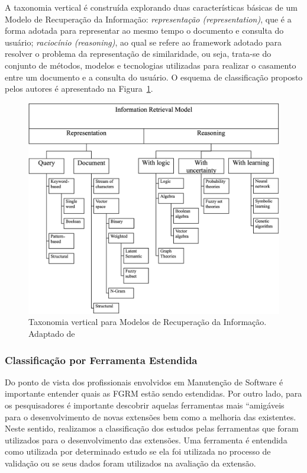 
A taxonomia vertical é construída explorando duas características básicas de um
Modelo de Recuperação da Informação: \textit{representação (representation)},
que é a forma adotada para representar ao mesmo tempo o documento e consulta do
usuário; \textit{raciocínio (reasoning)}, ao qual se refere ao framework adotado
para resolver o problema da representação de similaridade, ou seja, trata-se do
conjunto de métodos, modelos e tecnologias utilizadas para realizar o casamento
entre um documento e a consulta do usuário. O esquema de classificação proposto
pelos autores é apresentado na Figura~\ref{fig:information-retrieval-model}.

\begin{figure}[htpb]
	\centering
	\includegraphics[width=0.8\linewidth]{./chapter-mapeamento-sistematico/img/information-retrieval-model.png}
	\caption{Taxonomia vertical para Modelos de Recuperação da Informação.
		Adaptado
		de~\cite{cerulo2004taxonomy}}\label{fig:information-retrieval-model}
\end{figure}

\subsubsection{Classificação por Ferramenta Estendida}
\label{subsubsec:map-esquema-ferramenta}

Do ponto de vista dos profissionais envolvidos em Manutenção de Software é
importante entender quais as FGRM estão sendo estendidas. Por outro lado, para
os pesquisadores é importante descobrir aquelas ferramentas mais ``amigáveis
para o desenvolvimento de novas extensões bem como a melhoria das existentes.
Neste sentido, realizamos a classificação dos estudos pelas ferramentas que
foram utilizados para o desenvolvimento das extensões. Uma ferramenta é
entendida como utilizada por determinado estudo se ela foi utilizada no processo
de validação ou se seus dados foram utilizados na avaliação da extensão.

